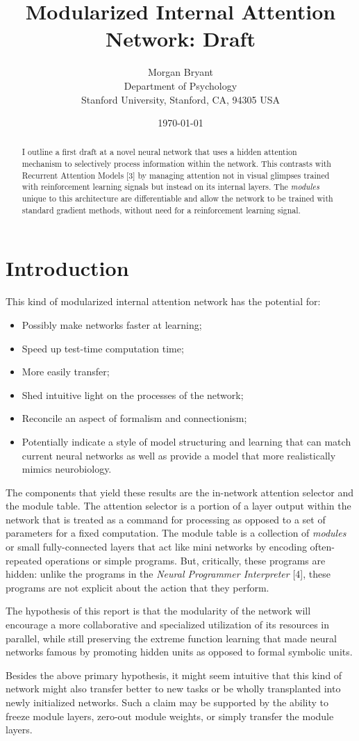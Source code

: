 \documentclass[12pt]{article}
\title{Modularized Internal Attention Network: Draft}
\author{
        Morgan Bryant\\
        Department of Psychology\\
		Stanford University, Stanford, CA, 94305 USA
}
\date{\today}
\begin{document}
\maketitle

\begin{abstract}
I outline a first draft at a novel neural network that uses a hidden attention mechanism to selectively process information within the network.  This contrasts with Recurrent Attention Models [3] by managing attention not in visual glimpses trained with reinforcement learning signals but instead on its internal layers.  The \textit{modules} unique to this architecture are differentiable and allow the network to be trained with standard gradient methods, without need for a reinforcement learning signal.
\end{abstract}

\section{Introduction}
This kind of modularized internal attention network has the potential for:
\begin{itemize}
	\item Possibly make networks faster at learning;
	\item Speed up test-time computation time;
	\item More easily transfer;
	\item Shed intuitive light on the processes of the network;
	\item Reconcile an aspect of formalism and connectionism;
	\item Potentially indicate a style of model structuring and learning that can match current neural networks as well as provide a model that more realistically mimics neurobiology.
\end{itemize}
The components that yield these results are the in-network attention selector and the module table.  The attention selector is a portion of a layer output within the network that is treated as a command for processing as opposed to a set of parameters for a fixed computation.  The module table is a collection of \textit{modules} or small fully-connected layers that act like mini networks by encoding often-repeated operations or simple programs.  But, critically, these programs are hidden: unlike the programs in the \textit{Neural Programmer Interpreter} [4], these programs are not explicit about the action that they perform.  \par 
The hypothesis of this report is that the modularity of the network will encourage a more collaborative and specialized utilization of its resources in parallel, while still preserving the extreme function learning that made neural networks famous by promoting hidden units as opposed to formal symbolic units.
\par
Besides the above primary hypothesis, it might seem intuitive that this kind of network might also transfer better to new tasks or be wholly transplanted into newly initialized networks.  Such a claim may be supported by the ability to freeze module layers, zero-out module weights, or simply transfer the module layers.
\end{document}

